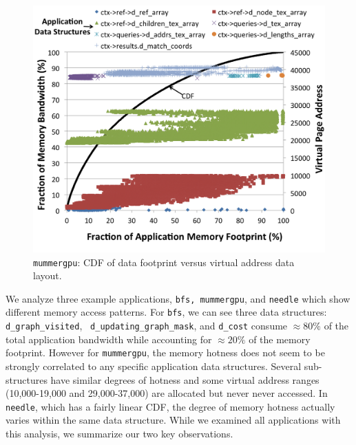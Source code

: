 \begin{figure}[t]
    \centering
    \includegraphics[width=0.9\columnwidth]{asplos2015/figures/mummerannotated.png}
    \caption{{\tt mummergpu}: CDF of data footprint versus virtual address data layout.}
    \label{fig:cdfannotation-muumergpu}
\end{figure}

We analyze three example applications, {\tt bfs, mummergpu}, and
{\tt needle} which show different memory access patterns. For {\tt bfs}, we can
see three data structures: {\tt d\_graph\_visited}, {\tt
d\_updating\_graph\_mask}, and {\tt d\_cost} consume {\color{black}$\approx80\%$
of the total application bandwidth while accounting for $\approx20\%$} of the
memory footprint.  However for {\tt mummergpu}, the memory hotness does not seem
to be strongly correlated to any specific application data structures. Several
sub-structures have similar degrees of hotness and some virtual address ranges
(10,000-19,000 and 29,000-37,000) are allocated but never never accessed. In
{\tt needle}, which has a fairly linear CDF, the degree of memory hotness
actually varies within the same data structure. While we examined all
applications with this analysis, we summarize our two key observations.


